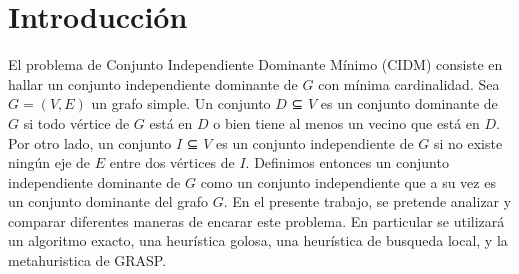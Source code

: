 \documentclass[a4paper]{article}
\begin{document}

\thispagestyle{empty}

\maketitle
\newpage

\thispagestyle{empty}
\vfill
%	
%

\thispagestyle{empty}
\vspace{1.5cm}
\tableofcontents
\newpage

 
\newpage
\section{Introducción}
El problema de Conjunto Independiente Dominante Mínimo (CIDM) consiste en hallar un conjunto independiente dominante de $G$ con mínima cardinalidad. Sea $G = (V, E)$ un grafo simple. Un conjunto $D$ ⊆ $V$ es un conjunto dominante de $G$ si todo vértice de $G$ está en $D$ o bien tiene al menos un vecino que está en $D$. Por otro lado, un conjunto $I$ ⊆ $V$ es un conjunto independiente de $G$ si no existe ningún eje de $E$ entre dos vértices de $I$. Definimos entonces un
conjunto independiente dominante de $G$ como un conjunto independiente que a su vez es un conjunto dominante del grafo $G$.
En el presente trabajo, se pretende analizar y comparar diferentes maneras de encarar este problema. En particular se utilizará un algoritmo exacto, una heurística golosa, una heurística de busqueda local, y la metahuristica de GRASP.
\end{document}
